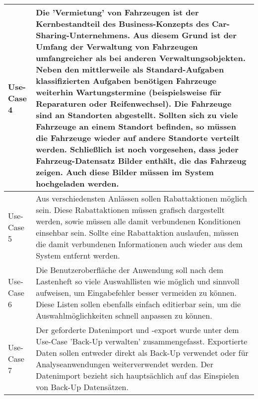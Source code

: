 \begin{tabular}{l | p{13cm}}
    \hline
    Use-Case 4 & Die 'Vermietung' von Fahrzeugen ist der Kernbestandteil des Business-Konzepts des Car-Sharing-Unternehmens. Aus diesem Grund ist der Umfang der Verwaltung von Fahrzeugen umfangreicher als bei anderen Verwaltungsobjekten. Neben den mittlerweile als Standard-Aufgaben klassifizierten Aufgaben benötigen Fahrzeuge weiterhin Wartungstermine (beispielsweise für Reparaturen oder Reifenwechsel). Die Fahrzeuge sind an Standorten abgestellt. Sollten sich zu viele Fahrzeuge an einem Standort befinden, so müssen die Fahrzeuge wieder auf andere Standorte verteilt werden. Schließlich ist noch vorgesehen, dass jeder Fahrzeug-Datensatz Bilder enthält, die das Fahrzeug zeigen. Auch diese Bilder müssen im System hochgeladen werden. \\
    \hline
    Use-Case 5 & Aus verschiedensten Anlässen sollen Rabattaktionen möglich sein. Diese Rabattaktionen müssen grafisch dargestellt werden, sowie müssen alle damit verbundenen Konditionen einsehbar sein. Sollte eine Rabattaktion auslaufen, müssen die damit verbundenen Informationen auch wieder aus dem System entfernt werden.\\
    \hline
    Use-Case 6 & Die Benutzeroberfläche der Anwendung soll nach dem Lastenheft so viele Auswahllisten wie möglich und sinnvoll aufweisen, um Eingabefehler besser vermeiden zu können. Diese Listen sollen ebenfalls einfach editierbar sein, um die Auswahlmöglichkeiten schnell anpassen zu können.\\
    \hline
    Use-Case 7 & Der geforderte Datenimport und -export wurde unter dem Use-Case 'Back-Up verwalten' zusammengefasst. Exportierte Daten sollen entweder direkt als Back-Up verwendet oder für Analyseanwendungen weiterverwendet werden. Der Datenimport bezieht sich hauptsächlich auf das Einspielen von Back-Up Datensätzen.\\
    \hline
\end{tabular}

